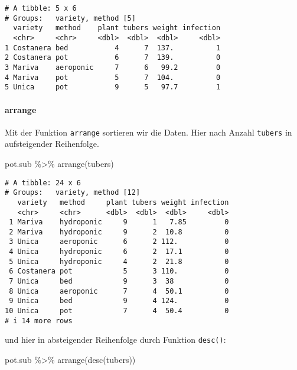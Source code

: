 \documentclass[
  letterpaper,
  DIV=11,
  numbers=noendperiod]{scrartcl}
\let\oldparagraph\paragraph
\renewcommand{\paragraph}[1]{\oldparagraph{#1}\mbox{}}
\newenvironment{Shaded}{\begin{snugshade}}{\end{snugshade}}
\newcommand{\FunctionTok}[1]{\textcolor[rgb]{0.28,0.35,0.67}{#1}}
\newcommand{\NormalTok}[1]{\textcolor[rgb]{0.00,0.23,0.31}{#1}}
\newcommand{\SpecialCharTok}[1]{\textcolor[rgb]{0.37,0.37,0.37}{#1}}
\begin{document}
\begin{verbatim}
# A tibble: 5 x 6
# Groups:   variety, method [5]
  variety   method    plant tubers weight infection
  <chr>     <chr>     <dbl>  <dbl>  <dbl>     <dbl>
1 Costanera bed           4      7  137.          1
2 Costanera pot           6      7  139.          0
3 Mariva    aeroponic     7      6   99.2         0
4 Mariva    pot           5      7  104.          0
5 Unica     pot           9      5   97.7         1
\end{verbatim}

\hypertarget{arrange}{%
\paragraph{arrange}\label{arrange}}

Mit der Funktion \texttt{arrange} sortieren wir die Daten. Hier nach
Anzahl \texttt{tubers} in aufsteigender Reihenfolge.

\begin{Shaded}
\begin{Highlighting}[]
\NormalTok{pot.sub }\SpecialCharTok{\%\textgreater{}\%} \FunctionTok{arrange}\NormalTok{(tubers)}
\end{Highlighting}
\end{Shaded}

\begin{verbatim}
# A tibble: 24 x 6
# Groups:   variety, method [12]
   variety   method     plant tubers weight infection
   <chr>     <chr>      <dbl>  <dbl>  <dbl>     <dbl>
 1 Mariva    hydroponic     9      1   7.85         0
 2 Mariva    hydroponic     9      2  10.8          0
 3 Unica     aeroponic      6      2 112.           0
 4 Unica     hydroponic     6      2  17.1          0
 5 Unica     hydroponic     4      2  21.8          0
 6 Costanera pot            5      3 110.           0
 7 Unica     bed            9      3  38            0
 8 Unica     aeroponic      7      4  50.1          0
 9 Unica     bed            9      4 124.           0
10 Unica     pot            7      4  50.4          0
# i 14 more rows
\end{verbatim}

und hier in absteigender Reihenfolge durch Funktion \texttt{desc()}:

\begin{Shaded}
\begin{Highlighting}[]
\NormalTok{pot.sub }\SpecialCharTok{\%\textgreater{}\%} \FunctionTok{arrange}\NormalTok{(}\FunctionTok{desc}\NormalTok{(tubers))}
\end{Highlighting}
\end{Shaded}
\end{document}
